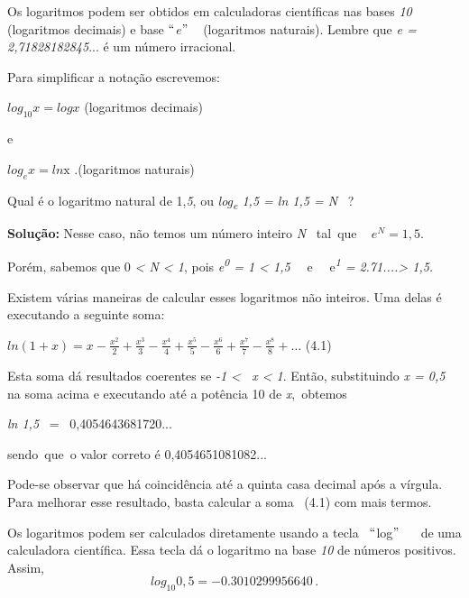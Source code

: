 Os logaritmos podem ser obtidos em calculadoras científicas nas bases \textit{10} (logaritmos decimais) e  base $``$\textit{e}$"$ ~ (logaritmos naturais). Lembre que \textit{e = 2,71828182845}... é um número irracional.

Para simplificar a notação escrevemos:

\begin{Center}
 \( log_{10}x=logx \)  \quad (logaritmos decimais)
\end{Center}

e

\begin{Center}
 \( log_{e}x=ln\textrm{x} \) .\quad \quad (logaritmos naturais)
\end{Center}

\begin{texemplo}
    Qual é o logaritmo natural de 1,\textit{5}, ou \textit{log\textsubscript{e} 1,5 = ln 1,5 = N~ }? 

    \textbf{Solução:} Nesse caso, não temos um número inteiro \textit{N}~ tal~que  ~  \(  e^{N}=1,5. \) 

    Porém, sabemos que 0\textit{ < N < 1}, pois \textit{e\textsuperscript{0} = 1 < 1,5~~ }e~~ e\textit{\textsuperscript{1} = 2.71....> 1,5.}~~ 
\end{texemplo}

Existem várias maneiras de calcular esses logaritmos não inteiros. Uma delas é executando a seguinte soma:

\( ln \left( 1+x \right) =x-\frac{x^{2}}{2} +\frac{x^{3}}{3} -\frac{x^{4}}{4} +\frac{x^{5}}{5} -\frac{x^{6}}{6} + \frac{x^{7}}{7}-\frac{x^{8}}{8}+ \ldots  \) \quad \quad (4.1)

Esta soma dá resultados coerentes se \textit{-1 <~ x < 1}. Então, substituindo \textit{x = 0,5 }na soma acima e executando até a potência 10 de \textit{x},~obtemos  

\textit{ln 1,5 }~=~  0,4054643681720...

sendo~que~o valor correto é   0,4054651081082...

Pode-se observar que há coincidência até a quinta casa decimal após a vírgula. Para melhorar esse resultado, basta calcular a soma~ (4.1) com mais termos. \qedsymbol{}
    
Os logaritmos podem ser calculados diretamente usando a tecla~ $``$log$"$ ~~ de uma calculadora científica. Essa tecla dá o logaritmo na base \textit{10} de números positivos. Assim, 
$$ log_{10}0,5=- 0.3010299956640 \,. $$

